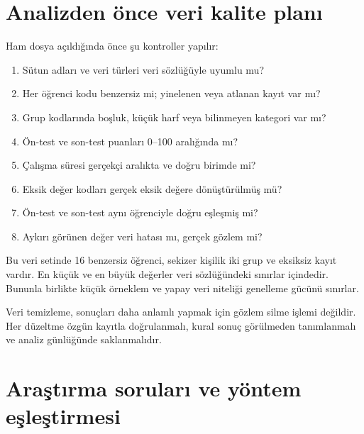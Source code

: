\section{Analizden önce veri kalite planı}

Ham dosya açıldığında önce şu kontroller yapılır:

\begin{enumerate}
  \item Sütun adları ve veri türleri veri sözlüğüyle uyumlu mu?
  \item Her öğrenci kodu benzersiz mi; yinelenen veya atlanan kayıt var mı?
  \item Grup kodlarında boşluk, küçük harf veya bilinmeyen kategori var mı?
  \item Ön-test ve son-test puanları 0--100 aralığında mı?
  \item Çalışma süresi gerçekçi aralıkta ve doğru birimde mi?
  \item Eksik değer kodları gerçek eksik değere dönüştürülmüş mü?
  \item Ön-test ve son-test aynı öğrenciyle doğru eşleşmiş mi?
  \item Aykırı görünen değer veri hatası mı, gerçek gözlem mi?
\end{enumerate}


Bu veri setinde 16 benzersiz öğrenci, sekizer kişilik iki grup ve eksiksiz
kayıt vardır. En küçük ve en büyük değerler veri sözlüğündeki sınırlar
içindedir. Bununla birlikte küçük örneklem ve yapay veri niteliği genelleme
gücünü sınırlar.

\begin{mistakebox}
Veri temizleme, sonuçları daha anlamlı yapmak için gözlem silme işlemi değildir.
Her düzeltme özgün kayıtla doğrulanmalı, kural sonuç görülmeden tanımlanmalı ve
analiz günlüğünde saklanmalıdır.
\end{mistakebox}

\section{Araştırma soruları ve yöntem eşleştirmesi}

